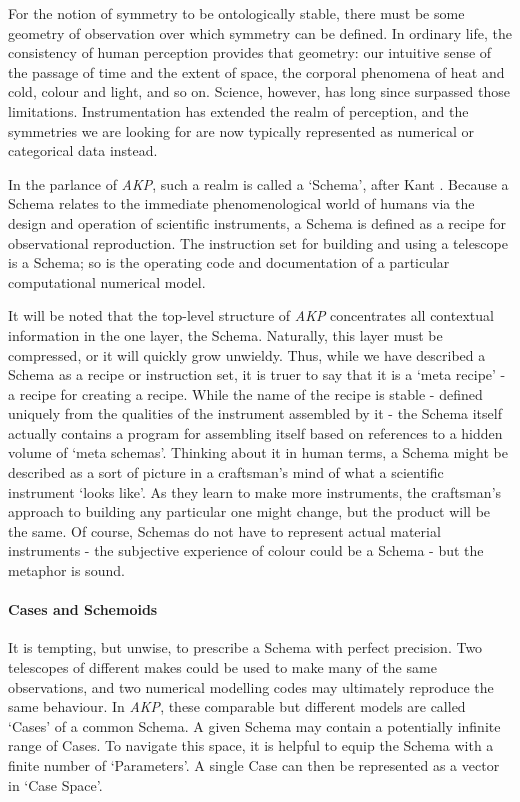 \documentclass[a4paper,11pt,oneside]{book}
\begin{document}
For the notion of symmetry to be ontologically stable, there must be some geometry of observation over which symmetry can be defined. In ordinary life, the consistency of human perception provides that geometry: our intuitive sense of the passage of time and the extent of space, the corporal phenomena of heat and cold, colour and light, and so on. Science, however, has long since surpassed those limitations. Instrumentation has extended the realm of perception, and the symmetries we are looking for are now typically represented as numerical or categorical data instead.

In the parlance of \textit{AKP}, such a realm is called a `Schema', after Kant \cite{Kant1781-su}. Because a Schema relates to the immediate phenomenological world of humans via the design and operation of scientific instruments, a Schema is defined as a recipe for observational reproduction. The instruction set for building and using a telescope is a Schema; so is the operating code and documentation of a particular computational numerical model.

It will be noted that the top-level structure of \textit{AKP} concentrates all contextual information in the one layer, the Schema. Naturally, this layer must be compressed, or it will quickly grow unwieldy. Thus, while we have described a Schema as a recipe or instruction set, it is truer to say that it is a `meta recipe' - a recipe for creating a recipe. While the name of the recipe is stable - defined uniquely from the qualities of the instrument assembled by it - the Schema itself actually contains a program for assembling itself based on references to a hidden volume of `meta schemas'. Thinking about it in human terms, a Schema might be described as a sort of picture in a craftsman's mind of what a scientific instrument `looks like'. As they learn to make more instruments, the craftsman's approach to building any particular one might change, but the product will be the same. Of course, Schemas do not have to represent actual material instruments - the subjective experience of colour could be a Schema - but the metaphor is sound.

\paragraph{Cases and Schemoids}

It is tempting, but unwise, to prescribe a Schema with perfect precision. Two telescopes of different makes could be used to make many of the same observations, and two numerical modelling codes may ultimately reproduce the same behaviour. In \textit{AKP}, these comparable but different models are called `Cases' of a common Schema. A given Schema may contain a potentially infinite range of Cases. To navigate this space, it is helpful to equip the Schema with a finite number of `Parameters'. A single Case can then be represented as a vector in `Case Space'.
\end{document}
